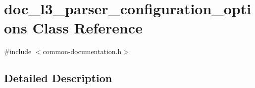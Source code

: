 \hypertarget{classdoc__l3__parser__configuration__options}{}\section{doc\+\_\+l3\+\_\+parser\+\_\+configuration\+\_\+options Class Reference}
\label{classdoc__l3__parser__configuration__options}


{\ttfamily \#include $<$common-\/documentation.\+h$>$}



\subsection{Detailed Description}
\begin{DoxyItemize}

\end{DoxyItemize}
